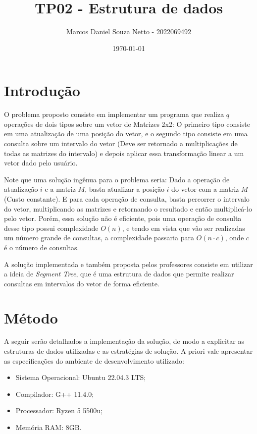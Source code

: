 \documentclass{article}
\title{TP02 - Estrutura de dados}
\author{Marcos Daniel Souza Netto - 2022069492}
\date{\today}
\begin{document}
\maketitle

\section{Introdução}

O problema proposto consiste em implementar um programa que realiza $q$ operações de dois tipos sobre um vetor de Matrizes 2x2: O primeiro tipo consiste em uma atualização de uma posição do vetor, e o segundo tipo consiste em uma consulta sobre um intervalo do vetor (Deve ser retornado a multiplicações de todas as matrizes do intervalo) e depois aplicar essa transformação linear a um vetor dado pelo usuário.

Note que uma solução ingênua para o problema seria: Dado a operação de atualização $i$ e a matriz $M$, basta atualizar a posição $i$ do vetor com a matriz $M$ (Custo constante). E para cada operação de consulta, basta percorrer o intervalo do vetor, multiplicando as matrizes e retornando o resultado e então multiplicá-lo pelo vetor. 
Porém, essa solução não é eficiente, pois uma operação de consulta desse tipo possui complexidade $O(n)$, e tendo em vista que vão ser realizadas um número grande de consultas, a complexidade passaria para $O(n \cdot c)$, onde $c$ é o número de consultas.

A solução implementada e também proposta pelos professores consiste em utilizar a ideia de \emph{Segment Tree}, que é uma estrutura de dados que permite realizar consultas em intervalos do vetor de forma eficiente. 

\section{Método}

A seguir serão detalhados a implementação da solução, de modo a explicitar 
as estruturas de dados utilizadas e as estratégias de solução. A priori vale 
apresentar as especificações do ambiente de desenvolvimento utilizado:

\begin{itemize}
    \item Sistema Operacional: Ubuntu 22.04.3 LTS;
    \item Compilador: G++ 11.4.0;
    \item Processador: Ryzen 5 5500u;
    \item Memória RAM: 8GB.
\end{itemize}
\end{document}
